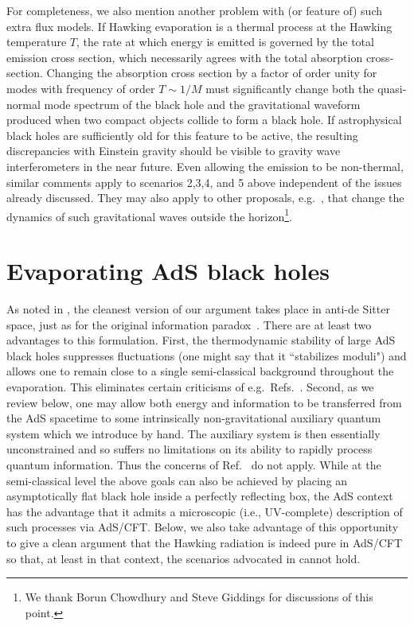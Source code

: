 \documentclass[12pt]{article}
\newcommand{\sect}[1]{\section{#1}\setcounter{equation}{0}}
\begin{document}
{For completeness, we also mention another problem with (or feature of) such extra flux models.  If Hawking evaporation is a thermal process at the Hawking temperature $T$, the rate at which energy is emitted is governed by the total emission cross section, which necessarily agrees with the total absorption cross-section.  Changing the absorption cross section by a factor of order unity for modes with frequency of order $T \sim 1/M$ must significantly change both the quasi-normal mode spectrum of the black hole and the gravitational waveform produced when two compact objects collide to form a black hole. {If astrophysical black holes are sufficiently old for this feature to be active,  the} resulting discrepancies with Einstein gravity should be visible to gravity wave interferometers in the near future.  Even allowing the emission to be non-thermal, similar comments apply to scenarios 2,3,4, and 5 above independent of the issues already discussed.  They may also apply to other proposals, e.g.\ \cite{Avery:2012tf}, that change the dynamics of such gravitational waves outside the horizon\footnote{We thank Borun Chowdhury and Steve Giddings for discussions of this point.}.


\sect{Evaporating AdS black holes}

\label{inAdS}

As noted in \cite{Almheiri:2012rt}, the cleanest version of our argument takes place in anti-de Sitter space, just as for the original information paradox~\cite{Maldacena:2001kr}.
There are at least two advantages to this formulation.  First, the thermodynamic stability of large AdS black holes suppresses fluctuations (one might say that it ``stabilizes moduli") and allows one to remain close to a single semi-classical background throughout the evaporation.  This eliminates certain criticisms of e.g.\ Refs.~\cite{Nomura2,Hsu}.  Second, as we review below, one may allow both energy and information to be transferred from the AdS spacetime to some intrinsically non-gravitational auxiliary quantum system which we introduce by hand.  The auxiliary system is then essentially unconstrained and so suffers no limitations on its ability to rapidly process quantum information.  Thus the concerns of Ref.~\cite{Harlow:2013tf} do not apply. While at the semi-classical level the above goals can also be achieved by placing an asymptotically flat black hole inside a perfectly reflecting box, the AdS context has the advantage that it admits a microscopic (i.e., UV-complete) description of such processes via AdS/CFT.  Below, we also take advantage of this opportunity to give a clean argument that the Hawking radiation is indeed pure in AdS/CFT so that, at least in that context, the scenarios advocated in \cite{Hossenfelder:2012mr,Jacobson:2012gh} cannot hold.


}
\end{document}
